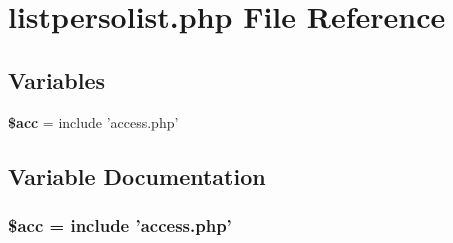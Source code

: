 \section{listpersolist.php File Reference}
\label{listpersolist_8php}


\subsection*{Variables}
\begin{CompactItemize}
\item 
{\bf \$acc} = include 'access.php'
\end{CompactItemize}


\subsection{Variable Documentation}
\subsubsection{\setlength{\rightskip}{0pt plus 5cm}\$acc = include 'access.php'}\label{listpersolist_8php_542926c588a05eb69553d79c83cf73da}



